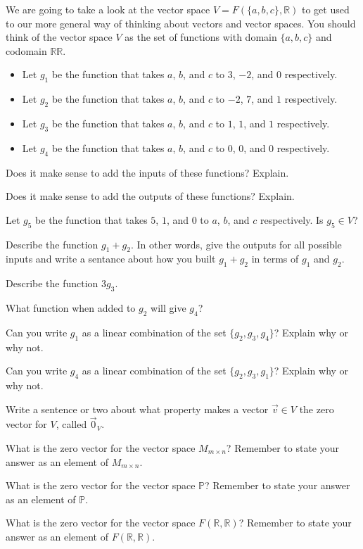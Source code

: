 \bq We are going to take a look at the vector space \break $V=F(\{a,b,c\},\mathbb{R})$ to get used to our more general way of thinking about vectors and vector spaces. You should think of the vector space $V$ as the set of functions with domain $\{a,b,c\}$ and codomain $\mathbb{RR}$.
\begin{itemize}
\item Let $g_1$ be the function that takes $a$, $b$, and $c$ to $3$, $-2$, and $0$ respectively.
\item Let $g_2$ be the function that takes $a$, $b$, and $c$ to $-2$, $7$, and $1$ respectively.
\item Let $g_3$ be the function that takes $a$, $b$, and $c$ to $1$, $1$, and $1$ respectively.
\item Let $g_4$ be the function that takes $a$, $b$, and $c$ to $0$, $0$, and $0$ respectively.
\end{itemize}
\be
\item Does it make sense to add the inputs of these functions? Explain.
\item Does it make sense to add the outputs of these functions? Explain.
\item Let $g_5$ be the function that takes $5$, $1$, and $0$ to $a$, $b$, and $c$ respectively. Is $g_5 \in V$?
\item Describe the function $g_1 +g_2$. In other words, give the outputs for all possible inputs and write a sentance about how you built $g_1+g_2$ in terms of $g_1$ and $g_2$.
\item Describe the function $3 g_3$.
\item What function when added to $g_2$ will give $g_4$?
\item Can you write $g_1$ as a linear combination of the set $\{ g_2 , g_3 , g_4\}$? Explain why or why not.
\item Can you write $g_4$ as a linear combination of the set $\{ g_2 , g_3 , g_1\}$? Explain why or why not.
\ee
\eq

\bq
\be
\item Write a sentence or two about what property makes a vector $\vec{v} \in V$ the zero vector for $V$, called $\vec{0}_V$.
\item What is the zero vector for the vector space $M_{m \times n}$? Remember to state your answer as an element of $M_{m \times n}$.
\item What is the zero vector for the vector space $\mathbb{P}$? Remember to state your answer as an element of $\mathbb{P}$.
\item What is the zero vector for the vector space $F(\mathbb{R},\mathbb{R})$? Remember to state your answer as an element of $F(\mathbb{R},\mathbb{R})$.
\ee
\eq
